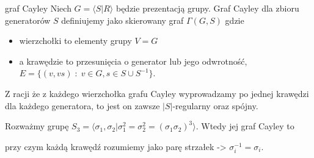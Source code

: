 \begin{definition}{graf Cayley}{}
  Niech $G=\langle S|R\rangle$ będzie prezentacją grupy. Graf Cayley dla zbioru generatorów $S$ definiujemy jako skierowany graf $\Gamma(G, S)$ gdzie
  \begin{itemize}
    \item wierzchołki to elementy grupy $V=G$
    \item a krawędzie to przesunięcia o generator lub jego odwrotność, $E=\{(v,vs)\;:\;v\in G, s\in S\cup S^{-1}\}$.
  \end{itemize}
\end{definition}

Z racji że z każdego wierzchołka grafu Cayley wyprowadzamy po jednej krawędzi dla każdego generatora, to jest on zawsze $|S|$-regularny oraz spójny.

\begin{example}
  Rozważmy grupę $S_3=\langle \sigma_1, \sigma_2|\sigma_1^2=\sigma_2^2=(\sigma_1\sigma_2)^3\rangle$. Wtedy jej graf Cayley to 
  \begin{center}
  \end{center}
  przy czym każdą krawędź rozumiemy jako parę strzałek -> $\sigma_i^{-1}=\sigma_i$.
\end{example}


